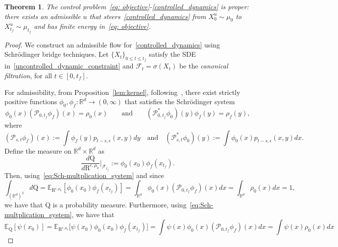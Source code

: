 \documentclass{amsart}
\newtheorem{theorem}{Theorem}[section]
\numberwithin{equation}{section}
\newcommand{\R}{\mathbb{R}}
\newcommand{\map}[3]{#1:#2 \rightarrow #3}
\begin{document}
\begin{theorem}\label{thm:properness}
The control problem~\eqref{eq: objective}-\eqref{controlled_dynamics} is proper: there exists an admissible $u$ that steers~\eqref{controlled_dynamics} from $ X_0^u\sim\mu_0$ to $ X_{t_f}^u\sim\mu_{t_f}$ and has finite energy in~\eqref{eq: objective}.%
\end{theorem}
\begin{proof}
We construct an admissible flow for~\eqref{controlled_dynamics} using Schr\"odinger bridge techniques. Let $\{ X_t\}_{0\leq t\leq t_f}$ satisfy the SDE in~\eqref{uncontrolled_dynamic_constraint} and $\mathcal F_{t}=\sigma( X_t)$ be the \emph{canonical filtration}, for all $t\in[0,t_f]$. 

For admissibility, from Proposition~\ref{lem:kernel}, following~\cite{Fortet1940}, there exist strictly positive functions $\map{\phi_0,\phi_f}{\mathbb R^d}{(0,\infty)}$ that satisfies  the Schr\"odinger system
\begin{equation}\label{eq:Sch-multplication_system}
\phi_0(x)(\mathscr P_{0,t_f} \phi_f)(x)=\rho_0(x)\qquad\text{and}\qquad (\mathscr P_{0,t_f}^* \phi_0)(y)\phi_f(y)=\rho_f(y),
\end{equation}
where 
\[
(\mathscr P_{s,t}\phi_f)(x):=\int \phi_f(y)p_{t-s,\epsilon}(x,y)dy\quad\text{and}\quad (\mathscr P_{s,t}^* \phi_0)(y):=\int \phi_0(x)p_{t-s,\epsilon}(x,y)dx.
\]
Define the measure on $\mathbb{R}^d\times \mathbb{R}^d$ as
\begin{equation}\label{eq: abs_distribution}
\frac{d\mathrm{Q}}{d\mathrm{R}^{\epsilon,\mu_0}}\Big|_{\mathcal F_{t_f}}:=\phi_0( x_0)\phi_f( x_{t_f}).    
\end{equation}
Then, using~\eqref{eq:Sch-multplication_system} and since
\[
\int_{(\mathbb{R}^d)^2}d\mathrm{Q}=\mathbb E_{\mathrm{R}^{\epsilon,\mu_0}}[\phi_0( x_0)\phi_f( x_{t_f})]
=\int_{\mathbb{R}^d} \phi_0(x)(\mathscr P_{0,t_f} \phi_f)(x)dx
=\int_{\mathbb{R}^d} \rho_0(x)dx=1,
\]
we have that $\mathrm{Q}$  is a probability measure. Furthermore, using~\eqref{eq:Sch-multplication_system}, we have that
\begin{equation*}
 \mathbb E_{\mathrm{Q}}[\psi( x_0)]
=\mathbb E_{\mathrm{R}^{\epsilon,\mu_0}} \big[\psi( x_0)\phi_0( x_0)\phi_f( x_{t_f})\big]
=\int \psi(x)\phi_0(x)(\mathscr P_{0,t_f} \phi_f)(x)dx =\int \psi(x)\rho_0(x)dx   
\end{equation*}

\end{proof}
\end{document}
